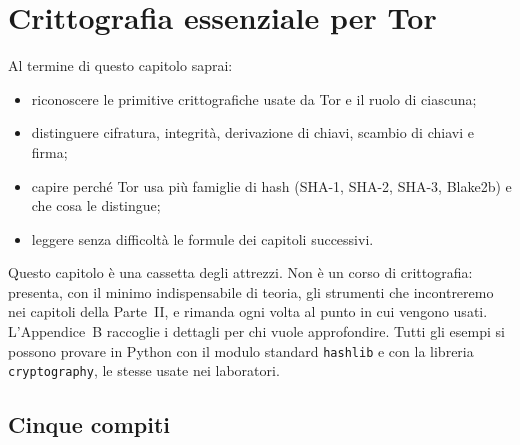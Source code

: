 \chapter{Crittografia essenziale per Tor}\label{cap:05-crittografia}

\begin{obiettivi}
Al termine di questo capitolo saprai:
\begin{itemize}[nosep]
  \item riconoscere le primitive crittografiche usate da Tor e il ruolo di ciascuna;
  \item distinguere cifratura, integrità, derivazione di chiavi, scambio di chiavi e firma;
  \item capire perché Tor usa più famiglie di hash (SHA-1, SHA-2, SHA-3, Blake2b) e che cosa le distingue;
  \item leggere senza difficoltà le formule dei capitoli successivi.
\end{itemize}
\end{obiettivi}

Questo capitolo è una cassetta degli attrezzi. Non è un corso di crittografia: presenta, con il minimo indispensabile di teoria, gli strumenti che incontreremo nei capitoli della Parte~II, e rimanda ogni volta al punto in cui vengono usati. L'Appendice~B raccoglie i dettagli per chi vuole approfondire. Tutti gli esempi si possono provare in Python con il modulo standard \texttt{hashlib} e con la libreria \texttt{cryptography}, le stesse usate nei laboratori.

\section{Cinque compiti}\label{sec:cripto-compiti}

